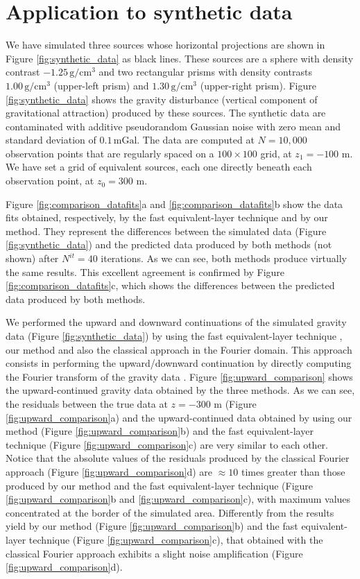 \section{Application to synthetic data}

We have simulated three sources whose horizontal projections are shown in 
Figure \ref{fig:synthetic_data} as black lines. 
These sources are a sphere with density contrast  
$-1.25\, \mathrm{g/cm^3}$ and two rectangular prisms with density contrasts 
$1.00\, \mathrm{g/cm^3}$ (upper-left prism) 
and $1.30\, \mathrm{g/cm^3}$ (upper-right prism). 
Figure \ref{fig:synthetic_data} shows the gravity disturbance (vertical component of 
gravitational attraction) produced by these sources. 
The synthetic data are contaminated with additive pseudorandom Gaussian 
noise with zero mean and standard deviation of $0.1 \, \mathrm{mGal}$.
The data are computed at $N = 10,000$ observation points that are regularly spaced on a 
$100 \times 100$ grid, at $z_{1} = -100$ m. 
We have set a grid of equivalent sources, each one directly beneath each 
observation point, at $z_{0} = 300$ m. 

Figure \ref{fig:comparison_datafits}a and \ref{fig:comparison_datafits}b show the data fits 
obtained, respectively, by the fast equivalent-layer technique \citep{siqueira-etal2017} 
and by our method. They represent the differences between the simulated data (Figure \ref{fig:synthetic_data}) and the predicted data produced by both methods 
(not shown) after $N^{it} = 40$ iterations. 
As we can see, both methods produce virtually the same results.
This excellent agreement is confirmed by Figure \ref{fig:comparison_datafits}c, which shows 
the differences between the predicted data produced by both methods.

We performed the upward and downward continuations of the simulated gravity data 
(Figure \ref{fig:synthetic_data}) by using the fast equivalent-layer technique
\citep{siqueira-etal2017}, our method and also the classical approach in the 
Fourier domain. This approach consists in performing the upward/downward continuation 
by directly computing the Fourier transform of the gravity data 
\citep[e.g., ][ p. 317]{blakely1996}.
Figure \ref{fig:upward_comparison} shows the upward-continued gravity data 
obtained by the three methods.
As we can see, the residuals between the true data at $z = -300$ m 
(Figure \ref{fig:upward_comparison}a) and the upward-continued data obtained by 
using our method (Figure \ref{fig:upward_comparison}b) and 
the fast equivalent-layer technique (Figure \ref{fig:upward_comparison}c) are very similar 
to each other.
Notice that the absolute values of the residuals produced by the classical Fourier 
approach (Figure \ref{fig:upward_comparison}d) are $\approx 10$ times greater than
those produced by our method and the fast equivalent-layer technique 
(Figure \ref{fig:upward_comparison}b and \ref{fig:upward_comparison}c), 
with maximum values concentrated at the border of the simulated area.
Differently from the results yield by our method (Figure \ref{fig:upward_comparison}b) 
and the fast equivalent-layer technique (Figure \ref{fig:upward_comparison}c), 
that obtained with the classical Fourier approach exhibits a slight noise 
amplification (Figure \ref{fig:upward_comparison}d).

